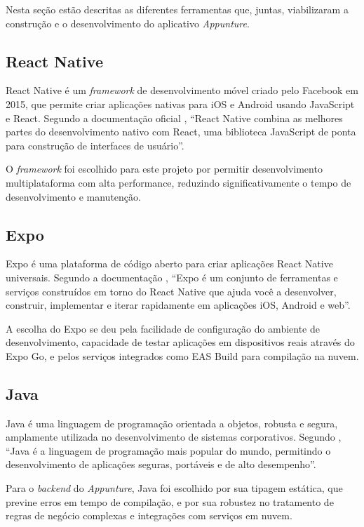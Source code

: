 Nesta seção estão descritas as diferentes ferramentas que, juntas, viabilizaram a construção e o desenvolvimento do aplicativo \textit{Appunture}.

\subsection{React Native}

React Native é um \textit{framework} de desenvolvimento móvel criado pelo Facebook em 2015, que permite criar aplicações nativas para iOS e Android usando JavaScript e React. Segundo a documentação oficial \cite{reactnative2023}, ``React Native combina as melhores partes do desenvolvimento nativo com React, uma biblioteca JavaScript de ponta para construção de interfaces de usuário''.

O \textit{framework} foi escolhido para este projeto por permitir desenvolvimento multiplataforma com alta performance, reduzindo significativamente o tempo de desenvolvimento e manutenção.

\subsection{Expo}

Expo é uma plataforma de código aberto para criar aplicações React Native universais. Segundo a documentação \cite{expo2023}, ``Expo é um conjunto de ferramentas e serviços construídos em torno do React Native que ajuda você a desenvolver, construir, implementar e iterar rapidamente em aplicações iOS, Android e web''.

A escolha do Expo se deu pela facilidade de configuração do ambiente de desenvolvimento, capacidade de testar aplicações em dispositivos reais através do Expo Go, e pelos serviços integrados como EAS Build para compilação na nuvem.

\subsection{Java}

Java é uma linguagem de programação orientada a objetos, robusta e segura, amplamente utilizada no desenvolvimento de sistemas corporativos. Segundo , ``Java é a linguagem de programação mais popular do mundo, permitindo o desenvolvimento de aplicações seguras, portáveis e de alto desempenho''.

Para o \textit{backend} do \textit{Appunture}, Java foi escolhido por sua tipagem estática, que previne erros em tempo de compilação, e por sua robustez no tratamento de regras de negócio complexas e integrações com serviços em nuvem.

